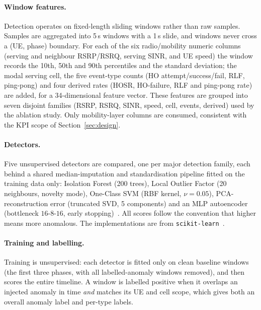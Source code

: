 \paragraph{Window features.}
Detection operates on fixed-length sliding windows rather than raw samples.
Samples are aggregated into 5\,s windows with a 1\,s slide, and windows never
cross a (UE, phase) boundary. For each of the six radio/mobility numeric columns
(serving and neighbour RSRP/RSRQ, serving SINR, and UE speed) the window
records the 10th, 50th and 90th percentiles and the standard deviation; the
modal serving cell, the five event-type counts (HO attempt/success/fail, RLF,
ping-pong) and four derived rates (HOSR, HO-failure, RLF and ping-pong rate) are
added, for a 34-dimensional feature vector. These features are grouped into
seven disjoint families (RSRP, RSRQ, SINR, speed, cell, events, derived) used by
the ablation study. Only mobility-layer columns are consumed, consistent with the
KPI scope of Section~\ref{sec:design}.

\paragraph{Detectors.}
Five unsupervised detectors are compared, one per major detection family, each
behind a shared median-imputation and standardisation pipeline fitted on the
training data only: Isolation Forest (200 trees), Local Outlier Factor (20
neighbours, novelty mode), One-Class SVM (RBF kernel, $\nu=0.05$),
PCA-reconstruction error (truncated SVD, 5 components) and an MLP autoencoder
(bottleneck $16$-$8$-$16$, early stopping)~\cite{liu2008isolation,breunig2000lof,scholkopf2001ocsvm,jolliffe2002pca,shyu2003pca}.
All scores follow the convention that higher means more anomalous. The
implementations are from \texttt{scikit-learn}~\cite{pedregosa2011scikit}.

\paragraph{Training and labelling.}
Training is unsupervised: each detector is fitted only on clean
baseline windows (the first three phases, with all labelled-anomaly windows
removed), and then scores the entire timeline. A window is labelled positive
when it overlaps an injected anomaly in time \emph{and} matches its UE and cell
scope, which gives both an overall anomaly label and per-type labels.

